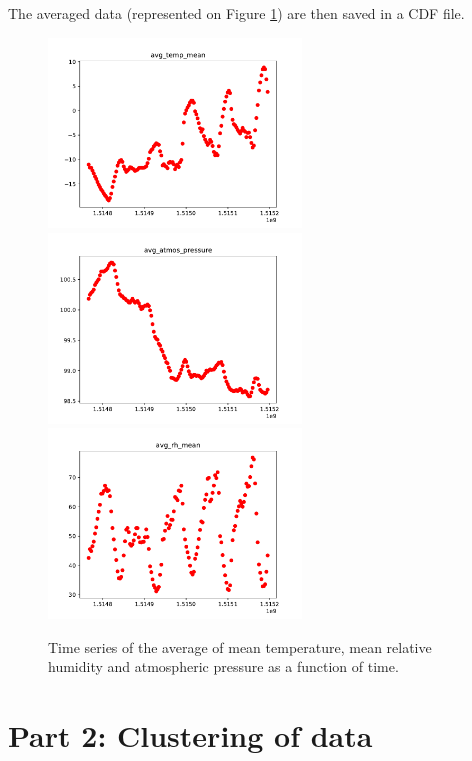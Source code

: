 \documentclass[11pt]{amsart}
\begin{document}
The averaged data (represented on Figure \ref{}) are then saved in a CDF file.
\begin{figure}
    \includegraphics[width=0.6\textwidth]{../plots/avg_temp_mean.pdf}
    \includegraphics[width=0.6\textwidth]{../plots/avg_atmos_pressure.pdf}
    \includegraphics[width=0.6\textwidth]{../plots/avg_rh_mean.pdf}
    \caption{Time series of the average of mean temperature, mean relative humidity and atmospheric pressure as a function of time.}
\end{figure}

\section{Part 2: Clustering of data}
\end{document}
